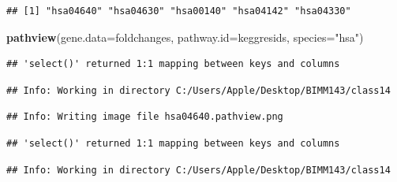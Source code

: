 \documentclass[
]{article}
\newenvironment{Shaded}{\begin{snugshade}}{\end{snugshade}}
\newcommand{\AttributeTok}[1]{\textcolor[rgb]{0.13,0.29,0.53}{#1}}
\newcommand{\CommentTok}[1]{\textcolor[rgb]{0.56,0.35,0.01}{\textit{#1}}}
\newcommand{\DecValTok}[1]{\textcolor[rgb]{0.00,0.00,0.81}{#1}}
\newcommand{\DocumentationTok}[1]{\textcolor[rgb]{0.56,0.35,0.01}{\textbf{\textit{#1}}}}
\newcommand{\FunctionTok}[1]{\textcolor[rgb]{0.13,0.29,0.53}{\textbf{#1}}}
\newcommand{\NormalTok}[1]{#1}
\newcommand{\OtherTok}[1]{\textcolor[rgb]{0.56,0.35,0.01}{#1}}
\newcommand{\SpecialCharTok}[1]{\textcolor[rgb]{0.81,0.36,0.00}{\textbf{#1}}}
\newcommand{\StringTok}[1]{\textcolor[rgb]{0.31,0.60,0.02}{#1}}
\begin{document}
\begin{Shaded}
\end{Shaded}

\begin{verbatim}
## [1] "hsa04640" "hsa04630" "hsa00140" "hsa04142" "hsa04330"
\end{verbatim}

\begin{Shaded}
\begin{Highlighting}[]
\FunctionTok{pathview}\NormalTok{(}\AttributeTok{gene.data=}\NormalTok{foldchanges, }\AttributeTok{pathway.id=}\NormalTok{keggresids, }\AttributeTok{species=}\StringTok{"hsa"}\NormalTok{)}
\end{Highlighting}
\end{Shaded}

\begin{verbatim}
## 'select()' returned 1:1 mapping between keys and columns
\end{verbatim}

\begin{verbatim}
## Info: Working in directory C:/Users/Apple/Desktop/BIMM143/class14
\end{verbatim}

\begin{verbatim}
## Info: Writing image file hsa04640.pathview.png
\end{verbatim}

\begin{verbatim}
## 'select()' returned 1:1 mapping between keys and columns
\end{verbatim}

\begin{verbatim}
## Info: Working in directory C:/Users/Apple/Desktop/BIMM143/class14
\end{verbatim}
\end{document}
